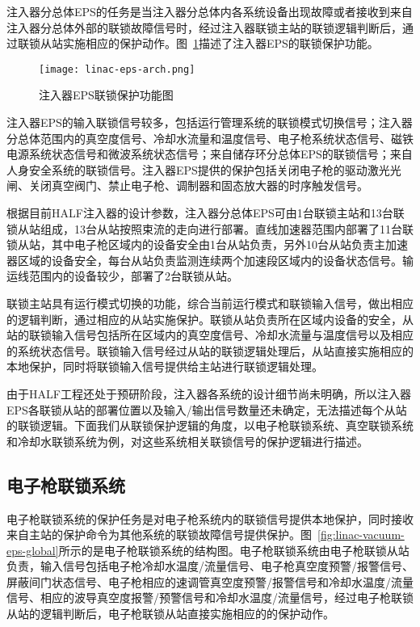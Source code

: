 注入器分总体EPS的任务是当注入器分总体内各系统设备出现故障或者接收到来自注入器分总体外部的联锁故障信号时，经过注入器联锁主站的联锁逻辑判断后，通过联锁从站实施相应的保护动作。图~\ref{fig:linac-eps-arch}描述了注入器EPS的联锁保护功能。

 \begin{figure}[!htb]
	\centering
	\texttt{[image: linac-eps-arch.png]}
	\caption{注入器EPS联锁保护功能图}
	\label{fig:linac-eps-arch}
\end{figure}

注入器EPS的输入联锁信号较多，包括运行管理系统的联锁模式切换信号；注入器分总体范围内的真空度信号、冷却水流量和温度信号、电子枪系统状态信号、磁铁电源系统状态信号和微波系统状态信号；来自储存环分总体EPS的联锁信号；来自人身安全系统的联锁信号。注入器EPS提供的保护包括关闭电子枪的驱动激光光闸、关闭真空阀门、禁止电子枪、调制器和固态放大器的时序触发信号。

根据目前HALF注入器的设计参数，注入器分总体EPS可由1台联锁主站和13台联锁从站组成，13台从站按照束流的走向进行部署。直线加速器范围内部署了11台联锁从站，其中电子枪区域内的设备安全由1台从站负责，另外10台从站负责主加速器区域的设备安全，每台从站负责监测连续两个加速段区域内的设备状态信号。输运线范围内的设备较少，部署了2台联锁从站。

联锁主站具有运行模式切换的功能，综合当前运行模式和联锁输入信号，做出相应的逻辑判断，通过相应的从站实施保护。联锁从站负责所在区域内设备的安全，从站的联锁输入信号包括所在区域内的真空度信号、冷却水流量与温度信号以及相应的系统状态信号。联锁输入信号经过从站的联锁逻辑处理后，从站直接实施相应的本地保护，同时将联锁输入信号提供给主站进行联锁逻辑处理。

由于HALF工程还处于预研阶段，注入器各系统的设计细节尚未明确，所以注入器EPS各联锁从站的部署位置以及输入/输出信号数量还未确定，无法描述每个从站的联锁逻辑。下面我们从联锁保护逻辑的角度，以电子枪联锁系统、真空联锁系统和冷却水联锁系统为例，对这些系统相关联锁信号的保护逻辑进行描述。

\subsection{电子枪联锁系统}

电子枪联锁系统的保护任务是对电子枪系统内的联锁信号提供本地保护，同时接收来自主站的保护命令为其他系统的联锁故障信号提供保护。图~\ref{fig:linac-vacuum-eps-global}所示的是电子枪联锁系统的结构图。电子枪联锁系统由电子枪联锁从站负责，输入信号包括电子枪冷却水温度/流量信号、电子枪真空度预警/报警信号、屏蔽间门状态信号、电子枪相应的速调管真空度预警/报警信号和冷却水温度/流量信号、相应的波导真空度报警/预警信号和冷却水温度/流量信号，经过电子枪联锁从站的逻辑判断后，电子枪联锁从站直接实施相应的的保护动作。

